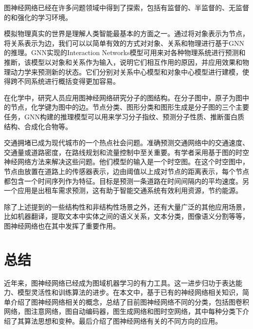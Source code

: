 \documentclass[UTF8]{ctexart}
\begin{document}
图神经网络已经在许多问题领域中得到了探索，包括有监督的、半监督的、无监督的和强化的学习环境。 \par

模拟物理真实的世界是理解人类智能最基本的方面之一。通过将对象表示为节点，将关系表示为边，我们可以以简单有效的方式对对象、关系和物理进行基于GNN的推理。GNN实现的Interaction Networks模型可用来对各种物理系统进行预测和推断，该模型以对象和关系作为输入，说明它们相互作用的原因，并应用效果和物理动力学来预测新的状态。它们分别对关系中心模型和对象中心模型进行建模，使得跨不同系统进行概括变得更加容易。 \par

在化学中，研究人员应用图神经网络研究分子的图结构。在分子图中，原子为图中的节点，化学键为图中的边。节点分类、图形分类和图形生成是分子图的三个主要任务，GNN构建的推理模型可以用来学习分子指纹、预测分子性质、推断蛋白质结构、合成化合物等。 \par

交通拥堵已成为现代城市的一个热点社会问题。准确预测交通网络中的交通速度、交通量或道路密度，在路线规划和流量控制中至关重要。有学者采用基于图的时空神经网络方法来解决这些问题。他们模型的输入是一个时空图。在这个时空图中，节点由放置在道路上的传感器表示，边由阈值以上成对节点的距离表示，每个节点都包含一个时间序列作为特征。目标是预测一条道路在时间间隔内的平均速度。另一个应用是出租车需求预测，这有助于智能交通系统有效利用资源，节约能源。 \par

除了上述提到的一些结构性和非结构性场景之外，还有大量广泛的其他应用场景，比如机器翻译，提取文本中实体之间的语义关系，文本分类，图像语义分割等等，图神经网络也在其中发挥了重要作用。

\section{总结}

近年来，图神经网络已经成为图域机器学习的有力工具。这一进步归功于表达能力、模型灵活性和训练算法的进步。在本文中，基于已有的神经网络相关知识，简单介绍了图神经网络相关的概念，总结了目前图神经网络不同的分类，包括图卷积网络，图注意网络，图自动编码器，图生成网络和图时空网络，其中每种分类下介绍了其算法思想和变种。最后介绍了图神经网络有关的不同方向的应用。
\end{document}
